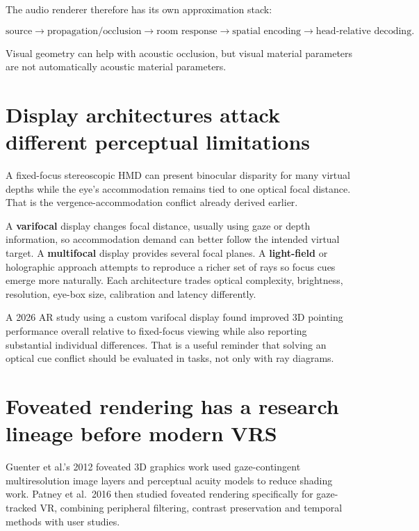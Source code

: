The audio renderer therefore has its own approximation stack:

\[
\text{source} \rightarrow
\text{propagation/occlusion} \rightarrow
\text{room response} \rightarrow
\text{spatial encoding} \rightarrow
\text{head-relative decoding}.
\]

Visual geometry can help with acoustic occlusion, but visual material parameters are not automatically acoustic material parameters.

\section{Display architectures attack different perceptual limitations}\label{04-visual-computing-ii-ch035-display-architectures-attack-different-perceptual-limitations}

A fixed-focus stereoscopic HMD can present binocular disparity for many virtual depths while the eye's accommodation remains tied to one optical focal distance. That is the vergence-accommodation conflict already derived earlier.

A \textbf{varifocal} display changes focal distance, usually using gaze or depth information, so accommodation demand can better follow the intended virtual target. A \textbf{multifocal} display provides several focal planes. A \textbf{light-field} or holographic approach attempts to reproduce a richer set of rays so focus cues emerge more naturally. Each architecture trades optical complexity, brightness, resolution, eye-box size, calibration and latency differently.

A 2026 AR study using a custom varifocal display found improved 3D pointing performance overall relative to fixed-focus viewing while also reporting substantial individual differences. That is a useful reminder that solving an optical cue conflict should be evaluated in tasks, not only with ray diagrams.

\section{Foveated rendering has a research lineage before modern VRS}\label{04-visual-computing-ii-ch035-foveated-rendering-has-a-research-lineage-before-modern-vrs}

Guenter et al.'s 2012 foveated 3D graphics work used gaze-contingent multiresolution image layers and perceptual acuity models to reduce shading work. Patney et al.~2016 then studied foveated rendering specifically for gaze-tracked VR, combining peripheral filtering, contrast preservation and temporal methods with user studies.

